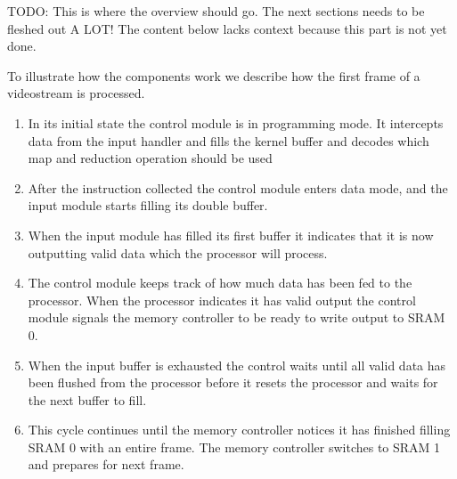 \begin{Description}
TODO: This is where the overview should go. The next sections needs to be fleshed out A LOT!
The content below lacks context because this part is not yet done.

To illustrate how the components work we describe how the first frame of a videostream is processed.
\begin{enumerate}

    \item In its initial state the control module is in programming mode. It intercepts data from the input handler and fills the kernel buffer and decodes which map and reduction operation should be used
    \item After the instruction collected the control module enters data mode, and the input module starts filling its double buffer.
    \item When the input module has filled its first buffer it indicates that it is now outputting valid data which the processor will process.
    \item The control module keeps track of how much data has been fed to the processor. When the processor indicates it has valid output the control module signals the memory controller to be ready to write output to SRAM 0.
    \item When the input buffer is exhausted the control waits until all valid data has been flushed from the processor before it resets the processor and waits for the next buffer to fill.
    \item This cycle continues until the memory controller notices it has finished filling SRAM 0 with an entire frame. The memory controller switches to SRAM 1 and prepares for next frame.
\end{enumerate}


\end{Description}

